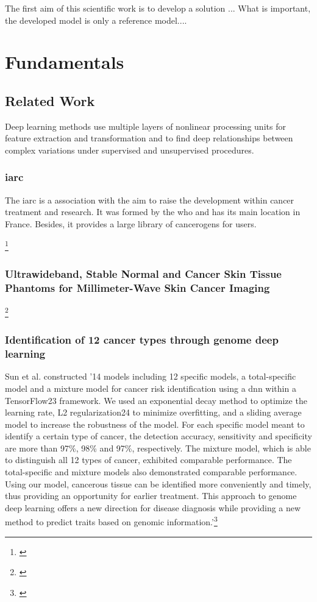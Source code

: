 The first aim of this scientific work is to develop a solution ...
What is important, the developed model is only a reference model....

\chapter{Fundamentals}\label{fundamentals}

\section{Related Work}

Deep learning methods use multiple layers of nonlinear processing units for feature extraction and transformation and to find deep relationships between complex variations under supervised and unsupervised procedures.

\subsection{\ac{iarc}}

The \ac{iarc} is a association with the aim to raise the development within cancer treatment and research. It was formed by the \ac{who} and has its main location in France. Besides, it provides a large library of cancerogens for users.

\footnote{\cite{iarc_world_cancer_report}}

\subsection{Ultrawideband, Stable Normal and Cancer Skin Tissue Phantoms for Millimeter-Wave Skin Cancer Imaging}

\footnote{\cite{8344452}}

\subsection{Identification of 12 cancer types through genome deep learning}

Sun et al. constructed '14 models including 12 specific models, a total-specific model and a mixture model for cancer risk identification using a \ac{dnn} within a TensorFlow23 framework. We used an exponential decay method to optimize the learning rate, L2 regularization24 to minimize overfitting, and a sliding average model to increase the robustness of the model. For each specific model meant to identify a certain type of cancer, the detection accuracy, sensitivity and specificity are more than 97\%, 98\% and 97\%, respectively. The mixture model, which is able to distinguish all 12 types of cancer, exhibited comparable performance. The total-specific and mixture models also demonstrated comparable performance. Using our model, cancerous tissue can be identified more conveniently and timely, thus providing an opportunity for earlier treatment. This approach to genome deep learning offers a new direction for disease diagnosis while providing a new method to predict traits based on genomic information.'\footnote{\cite{sun_identification}}

